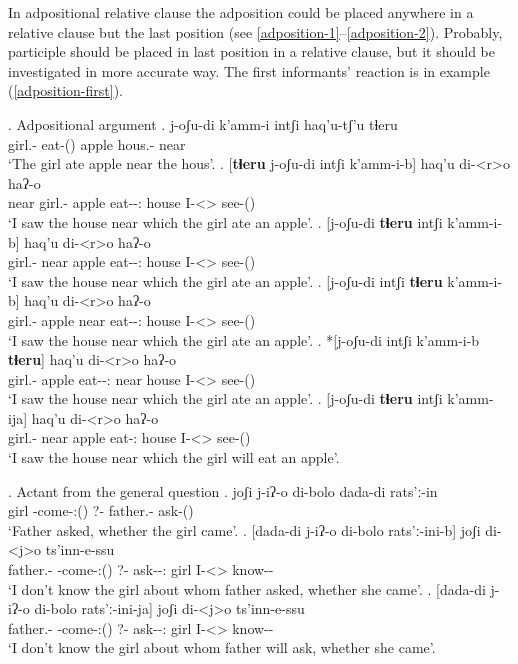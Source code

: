 In adpositional relative clause the adposition could be placed anywhere in a relative clause but the last position (see \ref{adposition-1}--\ref{adposition-2}). Probably, participle should be placed in last position in a relative clause, but it should be investigated in more accurate way. The first informants' reaction is in example (\ref{adposition-first}).

\ex. Adpositional argument
	\ag. j-oʃu-di k'amm-i intʃi haq'u-tʃ'u tɬeru\\
			{girl.\Obl-\Erg} {eat-\Pst(\Aor)} apple {hous.\Obl-\Ads} near\\
			\glt `The girl ate apple near the hous'.
	\bg. 	[\textbf{tɬeru} j-oʃu-di  intʃi k'amm-i-b] haq'u di-<r>o haʔ-o\\
			near {girl.\Obl-\Erg} apple {eat-\Pst-\Ptcp:\Pst} house  {I-<\Nans>\Aff} {see-\Pst(\Aor)} \label{adposition-1}\\
			\glt `I saw the house near which the girl ate an apple'.
	\bg. 	[j-oʃu-di \textbf{tɬeru} intʃi k'amm-i-b] haq'u di-<r>o haʔ-o\\
			{girl.\Obl-\Erg} near apple {eat-\Pst-\Ptcp:\Pst} house  {I-<\Nans>\Aff} {see-\Pst(\Aor)} \label{adposition-first}\\
			\glt `I saw the house near which the girl ate an apple'.
	\bg. 	[j-oʃu-di intʃi \textbf{tɬeru} k'amm-i-b] haq'u di-<r>o haʔ-o\\
			{girl.\Obl-\Erg} apple near  {eat-\Pst-\Ptcp:\Pst} house  {I-<\Nans>\Aff} {see-\Pst(\Aor)} \\
			\glt `I saw the house near which the girl ate an apple'.
	\bg. 	*[j-oʃu-di intʃi k'amm-i-b \textbf{tɬeru}] haq'u di-<r>o haʔ-o\\
			{girl.\Obl-\Erg} apple {eat-\Pst-\Ptcp:\Pst} near house  {I-<\Nans>\Aff} {see-\Pst(\Aor)} \\
			\glt `I saw the house near which the girl ate an apple'. \label{adposition-2}
	\bg. 	[j-oʃu-di \textbf{tɬeru} intʃi k'amm-ija] haq'u di-<r>o haʔ-o\\
			{girl.\Obl-\Erg} near apple {eat-\Ptcp:\Prae} house  {I-<\Nans>\Aff} {see-\Pst(\Aor)} \\
			\glt `I saw the house near which the girl will eat an apple'.

\ex. Actant from the general question
	\ag. joʃi j-iʔ-o di-bolo dada-di rats'ː-in\\
			{girl} {\F-come-\Pst:(\Aor)} {?-\Indef} {father.\Obl-\Erg} {ask-\Pst(\Aor)}\\
			\glt `Father asked, whether the girl came'.
	\bg. [dada-di  j-iʔ-o di-bolo rats'ː-ini-b] joʃi di-<j>o ts'inn-e-ssu\\
			{father.\Obl-\Erg} {\F-come-\Pst:(\Aor)} {?-\Indef} {ask-\Pst-\Ptcp:\Pst} {girl}  {I-<\F>\Aff} {know-\Hab-\Neg}\\
			\glt `I don't know the girl about whom father asked, whether she came'.
	\bg. [dada-di  j-iʔ-o di-bolo rats'ː-ini-ja] joʃi di-<j>o ts'inn-e-ssu\\
			{father.\Obl-\Erg} {\F-come-\Pst:(\Aor)} {?-\Indef} {ask-\Npst-\Ptcp:\Prae} {girl}  {I-<\F>\Aff} {know-\Hab-\Neg}\\
			\glt `I don't know the girl about whom father will ask, whether she came'.

